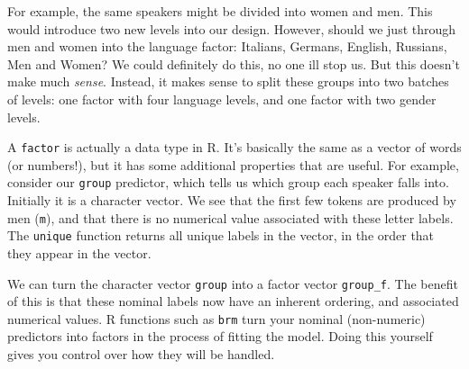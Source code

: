 \documentclass[
]{book}
\newenvironment{Shaded}{\begin{snugshade}}{\end{snugshade}}
\newcommand{\CommentTok}[1]{\textcolor[rgb]{0.56,0.35,0.01}{\textit{#1}}}
\newcommand{\DocumentationTok}[1]{\textcolor[rgb]{0.56,0.35,0.01}{\textbf{\textit{#1}}}}
\newcommand{\FunctionTok}[1]{\textcolor[rgb]{0.00,0.00,0.00}{#1}}
\newcommand{\NormalTok}[1]{#1}
\newcommand{\SpecialCharTok}[1]{\textcolor[rgb]{0.00,0.00,0.00}{#1}}
\begin{document}
For example, the same speakers might be divided into women and men. This would introduce two new levels into our design. However, should we just through men and women into the language factor: Italians, Germans, English, Russians, Men and Women? We could definitely do this, no one ill stop us. But this doesn't make much \emph{sense}. Instead, it makes sense to split these groups into two batches of levels: one factor with four language levels, and one factor with two gender levels.

A \texttt{factor} is actually a data type in R. It's basically the same as a vector of words (or numbers!), but it has some additional properties that are useful. For example, consider our \texttt{group} predictor, which tells us which group each speaker falls into. Initially it is a character vector. We see that the first few tokens are produced by men (\texttt{m}), and that there is no numerical value associated with these letter labels. The \texttt{unique} function returns all unique labels in the vector, in the order that they appear in the vector.

\begin{Shaded}
\end{Shaded}

We can turn the character vector \texttt{group} into a factor vector \texttt{group\_f}. The benefit of this is that these nominal labels now have an inherent ordering, and associated numerical values. R functions such as \texttt{brm} turn your nominal (non-numeric) predictors into factors in the process of fitting the model. Doing this yourself gives you control over how they will be handled.
\end{document}
